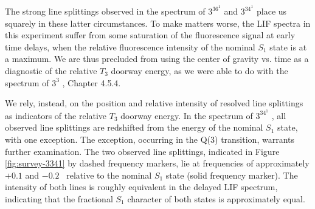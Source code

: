 \documentclass[12pt]{mitthesis}
\begin{document}
The strong line splittings observed in the spectrum of $3^36^1$ 
and $3^34^1$  place us squarely in these latter circumstances.
To make matters worse, the LIF spectra in this experiment suffer from
some saturation of the fluorescence signal at early time delays, when
the relative fluorescence intensity of the nominal $S_1$ state is at a
maximum. We are thus precluded from using the center of gravity
vs. time as a diagnostic of the relative $T_3$ doorway energy, as we
were able to do with the spectrum of $3^3$ , Chapter 4.5.4.

We rely, instead, on the position and relative intensity of resolved
line splittings as indicators of the relative $T_3$ doorway energy.
In the spectrum of $3^34^1$ , all observed line splittings are
redshifted from the energy of the nominal $S_1$ state, with one
exception.  The exception, occurring in the Q(3) transition, warrants
further examination.  The two observed line splittings, indicated in
Figure \ref{fig:survey-3341} by dashed frequency markers, lie at
frequencies of approximately $+0.1$ and $-0.2$ \rcm\ relative to the
nominal $S_1$ state (solid frequency marker).  The intensity of both
lines is roughly equivalent in the delayed LIF spectrum, indicating
that the fractional $S_1$ character of both states is approximately
equal.  
\end{document}
